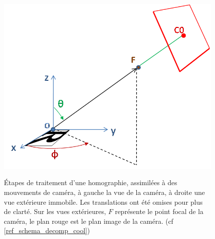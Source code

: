 \begin{figure}
{		{\includegraphics[scale=0.5]{vue_tps_hom_part.png}}}\\
		\caption{Étapes de traitement d'une homographie, assimilées à des mouvements de caméra, à gauche la vue de la caméra, à droite une vue extérieure immobile. Les translations ont été omises pour plus de clarté. Sur les vues extérieures, $F$ représente le point focal de la caméra, le plan rouge est le plan image de la caméra. (cf \ref{ref_schema_decomp_cool})}
		\label{schema_decomp_cool}
		\label{SchemaEtapesDecompoGeometrique}
	\end{figure}
